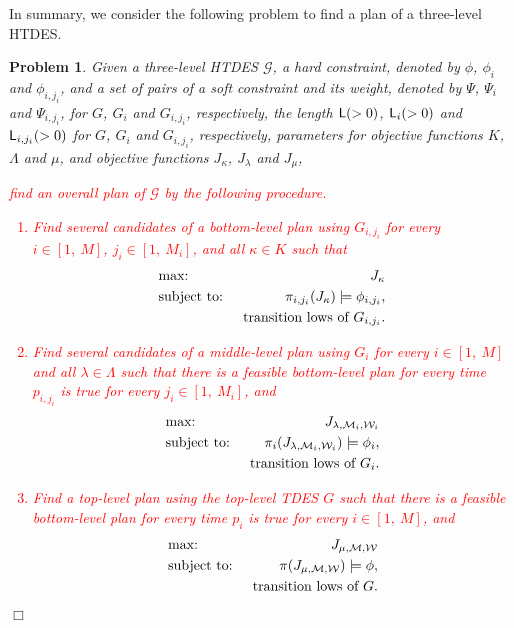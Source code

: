 \documentclass[journal,twoside,web]{IEEEtran}
\newcommand{\qedwhite}{\hfill \ensuremath{\Box}}
\newtheorem{pbm}{Problem}
\newcommand{\Len}{{\sf L}}
\newcommand{\M}{\mathcal{M}}
\newcommand{\W}{\mathcal{W}}
\newcommand{\red}[1]{\textcolor{red}{#1}}
\begin{document}
In summary, we consider the following problem to find a plan of a three-level HTDES.
\begin{pbm}\label{pbm3}
Given a three-level HTDES $\mathcal{G}$, a hard constraint, denoted by $\phi$, $\phi_i$ and $\phi_{i,{j_i}}$, and a set of pairs of a soft constraint and its weight, denoted by $\Psi$, $\Psi_i$ and $\Psi_{i,{j_i}}$, for $G$, $G_i$ and $G_{i,{j_i}}$, respectively, the length $\Len(>0)$, $\Len_i(>0)$ and $\Len_{i,{j_i}}(>0)$ for $G$,  $G_i$ and $G_{i,{j_i}}$, respectively, parameters for objective functions $K$, $\Lambda$ and $\mu$, and objective functions $J_\kappa$, $J_{\lambda}$ and $J_{\mu}$, \red{find an overall plan of $\mathcal{G}$ by the following procedure.
%
\begin{enumerate}
\item
Find several candidates of a bottom-level plan  %
using $G_{i,j_i}$ for every $i\in [1,~M]$, $j_i\in [1,~M_i]$,  and all $\kappa\in K$
such that 
\begin{eqnarray}
&\mbox{max: }&J_\kappa \notag \\
&\mbox{subject to: }&\pi_{i,{j_i}}(J_\kappa)\models \phi_{i,{j_i}},\notag%
\\&&\mbox{transition lows of }G_{i,{j_i}}.\notag 
\end{eqnarray}
%
%
%
\item
Find several candidates of a middle-level plan using $G_i$ for every $i\in [1,~M]$ and all $\lambda\in \Lambda$ 
such that there is a feasible bottom-level plan for every time $p_{i,j_i}$ is true for every $j_i\in [1,~M_i]$, and
\begin{eqnarray}
&\mbox{max: }&J_{\lambda,\M_i,\W_i}\notag \\
&\mbox{subject to: }&\pi_i(J_{\lambda,\M_i,\W_i})\models \phi_i,\notag%
 \\&&\mbox{transition lows of }G_i.\notag 
\end{eqnarray}
%
\item
Find a top-level plan using the top-level TDES $G$  such that there is a feasible bottom-level plan for every time $p_{i}$ is true for every $i\in [1,~M]$, and
\begin{eqnarray}
&\mbox{max: }&J_{\mu,\M,\W}\notag \\
&\mbox{subject to: }&\pi(J_{\mu,\M,\W})\models \phi,\notag%
\\&&\mbox{transition lows of }G.\notag 
\end{eqnarray}
\end{enumerate}
}
%
%
%
\qedwhite
\end{pbm}
%
\end{document}
